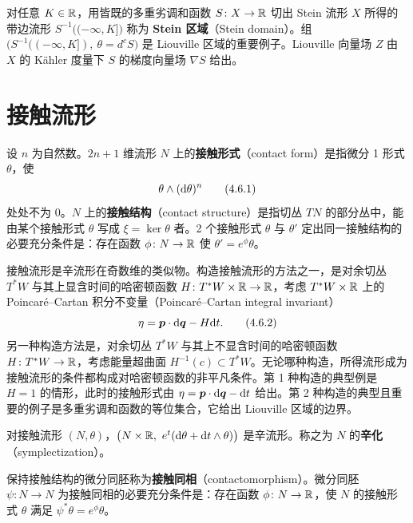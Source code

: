 对任意 $K\in\mathbb{R}$，用皆既的多重劣调和函数 $S\colon X\to\mathbb{R}$ 切出 Stein 流形 $X$ 所得的带边流形 $S^{-1}\bigl((-\infty,K]\bigr)$ 称为 \textbf{Stein 区域}（Stein domain）。组 $\bigl(S^{-1}((-\infty,K]),\ \theta = d^cS\bigr)$ 是 Liouville 区域的重要例子。Liouville 向量场 $Z$ 由 $X$ 的 Kähler 度量下 $S$ 的梯度向量场 $\nabla S$ 给出。



\section{接触流形}

设 $n$ 为自然数。$2n+1$ 维流形 $N$ 上的\textbf{接触形式}（contact form）是指微分 1 形式 $\theta$，使
\begin{equation}
  \theta\wedge(\mathrm{d}\theta)^n
  \tag{4.6.1}
\end{equation}
处处不为 0。$N$ 上的\textbf{接触结构}（contact structure）是指切丛 $TN$ 的部分丛中，能由某个接触形式 $\theta$ 写成 $\xi = \ker\theta$ 者。2 个接触形式 $\theta$ 与 $\theta'$ 定出同一接触结构的必要充分条件是：存在函数 $\phi\colon N\to\mathbb{R}$ 使 $\theta' = e^\phi\theta$。

接触流形是辛流形在奇数维的类似物。构造接触流形的方法之一，是对余切丛 $T^*W$ 与其上显含时间的哈密顿函数 $H\colon T^*W\times\mathbb{R}\to\mathbb{R}$，考虑 $T^*W\times\mathbb{R}$ 上的 Poincaré--Cartan 积分不变量（Poincaré--Cartan integral invariant）
\begin{equation}
  \eta = \bm{p}\cdot\mathrm{d}\bm{q} - H\mathrm{d} t.
  \tag{4.6.2}
\end{equation}
另一种构造方法是，对余切丛 $T^*W$ 与其上不显含时间的哈密顿函数 $H\colon T^*W\to\mathbb{R}$，考虑能量超曲面 $H^{-1}(c)\subset T^*W$。无论哪种构造，所得流形成为接触流形的条件都构成对哈密顿函数的非平凡条件。第 1 种构造的典型例是 $H=1$ 的情形，此时的接触形式由 $\eta = \bm{p}\cdot\mathrm{d}\bm{q}-\mathrm{d} t$ 给出。第 2 种构造的典型且重要的例子是多重劣调和函数的等位集合，它给出 Liouville 区域的边界。

对接触流形 $(N,\theta)$，$\bigl(N\times\mathbb{R},\ e^t(\mathrm{d}\theta+\mathrm{d} t\wedge\theta)\bigr)$ 是辛流形。称之为 $N$ 的\textbf{辛化}（symplectization）。

保持接触结构的微分同胚称为\textbf{接触同相}（contactomorphism）。微分同胚 $\psi\colon N\to N$ 为接触同相的必要充分条件是：存在函数 $\phi\colon N\to\mathbb{R}$，使 $N$ 的接触形式 $\theta$ 满足 $\psi^*\theta = e^\phi\theta$。

